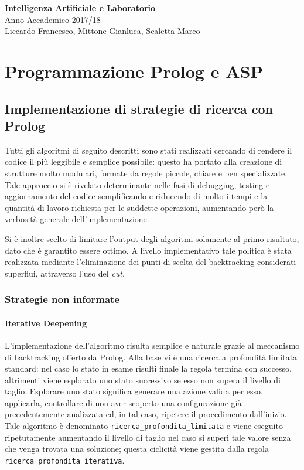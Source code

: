\documentclass[a4paper,oneside,12pt]{book}
\def \code#1{\texttt{#1}}
\begin{document}
	\begin{center}
	{\LARGE {\bf Intelligenza Artificiale e Laboratorio}\\
	\vspace*{6mm}}
	{\Large Anno Accademico 2017/18}\\
	\vspace*{6mm}
	\vspace*{6mm}
	Liccardo Francesco, Mittone Gianluca, Scaletta Marco
	\end{center}
	\newpage
	\chapter*{Programmazione Prolog e ASP}
	\section*{Implementazione di strategie di ricerca con Prolog}
	Tutti gli algoritmi di seguito descritti sono stati realizzati cercando di rendere il codice il più 	leggibile e semplice possibile: questo ha portato alla creazione di strutture molto modulari, 	formate da regole piccole, chiare e ben specializzate. Tale approccio si è rivelato 	determinante nelle fasi di debugging, testing e aggiornamento del codice semplificando e 	riducendo di molto i tempi e la quantità di lavoro richiesta per le suddette operazioni, 	aumentando però la verbosità generale dell’implementazione.

	Si è inoltre scelto di limitare l’output degli algoritmi solamente al primo risultato, 	dato che è garantito essere ottimo. A livello implementativo tale politica è stata realizzata 	mediante l’eliminazione dei punti di scelta del backtracking considerati superflui, attraverso l’uso del 	\textit{cut}.
	\subsection*{Strategie non informate}
	\subsubsection{Iterative Deepening}

	L’implementazione dell’algoritmo risulta semplice e naturale grazie al meccanismo di backtracking offerto da Prolog. Alla base vi è una ricerca a profondità limitata standard: nel caso lo stato in esame risulti finale la regola termina con successo, altrimenti viene esplorato uno stato successivo se esso non supera il livello di taglio. Esplorare uno stato significa generare una azione valida per esso, applicarla, controllare di non aver scoperto una configurazione già precedentemente analizzata ed, in tal caso, ripetere il procedimento dall’inizio. Tale algoritmo è denominato
	\code{ricerca\_profondita\_limitata} e viene eseguito ripetutamente aumentando il livello di taglio nel caso si superi tale valore senza che venga trovata una soluzione; questa ciclicità viene gestita dalla regola \code{ricerca\_profondita\_iterativa}.
\end{document}
